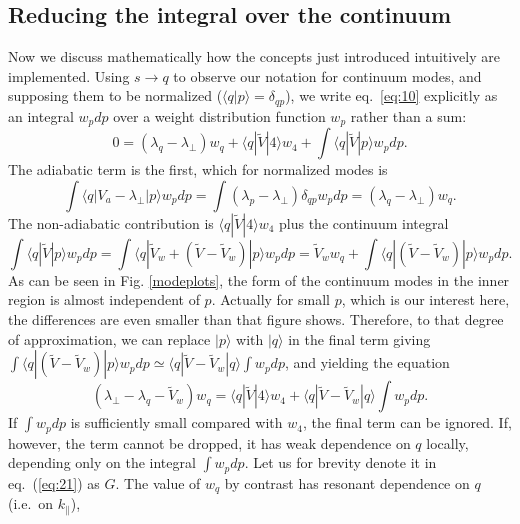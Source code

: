 \documentclass[12pt]{article}
\def\ket#1{|#1\rangle}
\def\bra#1{\langle#1}
\begin{document}
\subsection{Reducing the integral over the continuum}
\label{reducing}
Now we discuss mathematically how the concepts just introduced
intuitively are implemented.  Using $s\to q$ to observe our notation
for continuum modes, and supposing them to be normalized
($\bra{q}\ket{p}=\delta_{qp}$), we write eq.\ \ref{eq:10} explicitly
as an integral $w_pdp$ over a weight distribution function $w_p$
rather than a sum:
\begin{equation}
  \label{continw}
  0=(\lambda_q-\lambda_\perp)w_q+\bra{q}|\tilde{V}\ket{4}w_4
  +\int\bra{q}|\tilde{V}\ket{p}w_pdp.
\end{equation}
The adiabatic term is the first, which for normalized modes is
\begin{equation}
  \label{eq:contadiab}
  \int\bra{q}|V_a-\lambda_\perp\ket{p}w_pdp = \int
  (\lambda_p-\lambda_\perp)\delta_{qp}w_pdp = (\lambda_q-\lambda_\perp)w_q.
\end{equation}
The non-adiabatic contribution is $\bra{q}|\tilde{V}\ket{4}w_4$ plus the
continuum integral
\begin{equation}
  \label{eq:18}
  \int \bra{q}|\tilde{V}\ket{p}w_pdp=\int\bra{q}|\tilde{V}_{w}+(\tilde{V}-\tilde{V}_{w})\ket{p}w_pdp
  =\tilde{V}_{w}w_q +\int\bra{q}|(\tilde{V}-\tilde{V}_{w})\ket{p}w_pdp.
\end{equation}
As can be seen in Fig. \ref{modeplots}, the form of the continuum
modes in the inner region is almost independent of $p$. Actually for
small $p$, which is our interest here, the differences are even
smaller than that figure shows. Therefore, to that degree of
approximation, we can replace $\ket{p}$ with $\ket{q}$ in the final
term giving $\int\bra{q}|(\tilde{V}-\tilde{V}_{w})\ket{p}w_pdp\simeq
\bra{q}|\tilde{V}-\tilde{V}_{w}\ket{q}\int w_pdp$, and yielding the
equation
\begin{equation}
  \label{eq:21}
  (\lambda_\perp-\lambda_q-\tilde V_w)w_q= \bra{q}|\tilde{V}\ket{4}w_4
  +\bra{q}|\tilde{V}-\tilde{V}_{w}\ket{q}\int w_pdp.
\end{equation}
If $\int w_pdp$ is sufficiently small compared with $w_4$, the final
term can be ignored.  If, however, the term cannot be dropped, it has
weak dependence on $q$ locally, depending only on the integral
$\int w_pdp$. Let us for brevity denote it in eq.\ (\ref{eq:21}) as
$G$. The value of $w_q$ by contrast has resonant dependence on $q$
(i.e.\ on $k_\parallel$),
\end{document}
